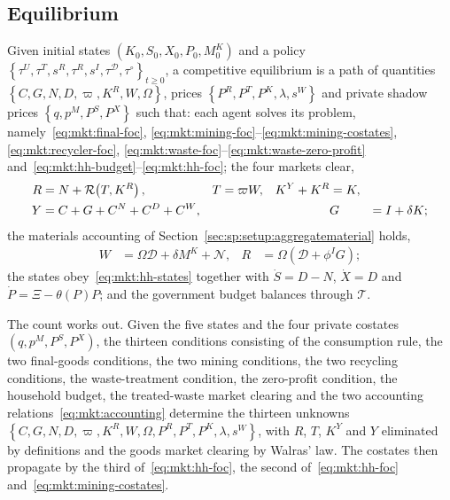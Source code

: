 \subsection{Equilibrium}\label{sec:mkt:setup:equilibrium}

\begin{definition}\label{def:mkt:equilibrium}
Given initial states $\left(K_0,S_0,X_0,P_0,M^K_0\right)$ and a policy
$\left\{\tau^U,\tau^T,s^R,\tau^R,s^I,\tau^{\mathcal D},\tau^{\circ}\right\}_{t\ge0}$, a competitive
equilibrium is a path of quantities $\left\{C,G,N,D,\varpi,K^R,W,\Omega\right\}$, prices
$\left\{P^R,P^T,P^K,\lambda,s^W\right\}$ and private shadow prices
$\left\{q,p^M,P^S,P^X\right\}$ such that: each agent solves its problem,
namely~\eqref{eq:mkt:final-foc}, \eqref{eq:mkt:mining-foc}--\eqref{eq:mkt:mining-costates},
\eqref{eq:mkt:recycler-foc}, \eqref{eq:mkt:waste-foc}--\eqref{eq:mkt:waste-zero-profit}
and~\eqref{eq:mkt:hh-budget}--\eqref{eq:mkt:hh-foc}; the four markets clear,
\begin{align}
R &= N+\mathcal R\!\left(T,K^R\right),
&
T &= \varpi W,
&
K^Y+K^R &= K,
\notag
\\
Y &= C+G+C^N+C^D+C^W,
&&&&
G &= I+\delta K;
\label{eq:mkt:clearing}
\end{align}
the materials accounting of Section~\ref{sec:sp:setup:aggregatematerial} holds,
\begin{align}
W &= \Omega\mathcal D+\delta M^K+\mathcal N,
&
R &= \Omega\left(\mathcal D+\phi^IG\right);
\label{eq:mkt:accounting}
\end{align}
the states obey~\eqref{eq:mkt:hh-states} together with $\dot S=D-N$, $\dot X=D$ and
$\dot P=\Xi-\theta\left(P\right)P$; and the government budget balances through $\mathcal T$.
\end{definition}

The count works out. Given the five states and the four private costates
$\left(q,p^M,P^S,P^X\right)$, the thirteen conditions consisting of the consumption
rule, the two final-goods conditions, the two mining conditions, the two recycling conditions, the
waste-treatment condition, the zero-profit condition, the household budget, the treated-waste market
clearing and the two accounting relations~\eqref{eq:mkt:accounting} determine the thirteen unknowns
$\left\{C,G,N,D,\varpi,K^R,W,\Omega,P^R,P^T,P^K,\lambda,s^W\right\}$, with $R$, $T$, $K^Y$ and $Y$
eliminated by definitions and the goods market clearing by Walras' law. The costates then propagate by
the third of~\eqref{eq:mkt:hh-foc}, the second of~\eqref{eq:mkt:hh-foc} and~\eqref{eq:mkt:mining-costates}.

